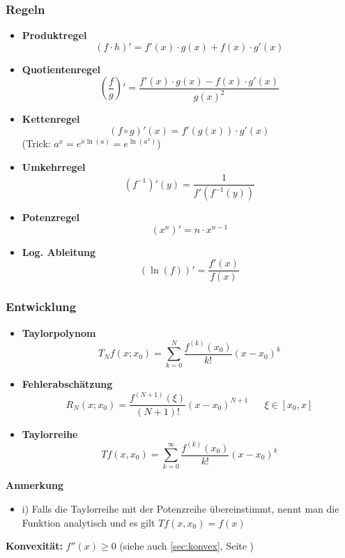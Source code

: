 \documentclass[8pt, a4paper, landscape, fleqn]{scrartcl}
\newenvironment {annotation}[1]
				{\begin{itshape} \begin{small} \textbf{#1} \begin{itemize}}
				{\end{itemize} \end{small} \end{itshape}}
\begin{document}
\begin{multicols*}{3}
				\subsubsection{Regeln}
					\begin{itemize}
						\item \textbf{Produktregel} \[(f \cdot h)'=f'(x) \cdot g(x)+f(x) \cdot g'(x)\]
						\item \textbf{Quotientenregel} \[\left(\frac{f}{g}\right)'=\frac{f'(x) \cdot g(x)-f(x) \cdot g'(x)}{g(x)^2}\]
						\item \textbf{Kettenregel}
						\[\left(f \circ g\right)'(x)= f'(g(x)) \cdot g'(x)\]
						(Trick: $a^x = e^{x \ln (a)}= e^{\ln(a^x)}$)
						\item \textbf{Umkehrregel}
						\[\left(f^{-1}\right)'(y)=\frac{1}{f'\left(f^{-1}(y) \right)}\]
						\item \textbf{Potenzregel}
						\[\left(x^n\right)' = n \cdot x^{n-1}\]
						\item \textbf{Log. Ableitung}
						\[\left( \ln(f)\right)' = \frac{f'(x)}{f(x)}\]
					\end{itemize}
				\subsubsection{Entwicklung}
					\begin{itemize}
						\item \textbf{Taylorpolynom}
						\begin{equation*}
							T_Nf(x; x_0)=\sum_{k=0}^{N}\frac{f^{(k)}(x_0)}{k!}(x-x_0)^k
						\end{equation*}
						\item \textbf{Fehlerabschätzung}
						\begin{equation*}
							R_N(x;x_0)=\frac{f^{(N+1)}(\xi)}{(N+1)!}(x-x_0)^{N+1} \hspace{20pt} \xi \in [x_0, x]
						\end{equation*}
						\item \textbf{Taylorreihe}
						\begin{equation*}
							Tf(x, x_0)=\sum_{k=0}^{\infty} \frac{f^{(k)}(x_0)}{k!}(x-x_0)^k
						\end{equation*}
					\end{itemize}
					\begin{annotation}{Anmerkung}
						\item[i)] Falls die Taylorreihe mit der Potenzreihe übereinstimmt, nennt man die Funktion analytisch und es gilt $Tf(x, x_0)=f(x)$
					\end{annotation}
					\textbf{Konvexität: } $f''(x) \geq 0$ (siehe auch \ref{sec:konvex}, Seite \pageref{sec:konvex})

\end{multicols*}
\end{document}
